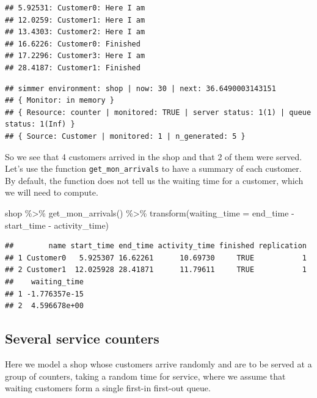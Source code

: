 \documentclass[
]{book}
\newenvironment{Shaded}{\begin{snugshade}}{\end{snugshade}}
\newcommand{\AttributeTok}[1]{\textcolor[rgb]{0.77,0.63,0.00}{#1}}
\newcommand{\FunctionTok}[1]{\textcolor[rgb]{0.00,0.00,0.00}{#1}}
\newcommand{\NormalTok}[1]{#1}
\newcommand{\SpecialCharTok}[1]{\textcolor[rgb]{0.00,0.00,0.00}{#1}}
\begin{document}
\begin{verbatim}
## 5.92531: Customer0: Here I am
## 12.0259: Customer1: Here I am
## 13.4303: Customer2: Here I am
## 16.6226: Customer0: Finished
## 17.2296: Customer3: Here I am
## 28.4187: Customer1: Finished
\end{verbatim}

\begin{verbatim}
## simmer environment: shop | now: 30 | next: 36.6490003143151
## { Monitor: in memory }
## { Resource: counter | monitored: TRUE | server status: 1(1) | queue status: 1(Inf) }
## { Source: Customer | monitored: 1 | n_generated: 5 }
\end{verbatim}

So we see that 4 customers arrived in the shop and that 2 of them were served. Let's use the function \texttt{get\_mon\_arrivals} to have a summary of each customer. By default, the function does not tell us the waiting time for a customer, which we will need to compute.

\begin{Shaded}
\begin{Highlighting}[]
\NormalTok{shop }\SpecialCharTok{\%\textgreater{}\%}
  \FunctionTok{get\_mon\_arrivals}\NormalTok{() }\SpecialCharTok{\%\textgreater{}\%}
  \FunctionTok{transform}\NormalTok{(}\AttributeTok{waiting\_time =}\NormalTok{ end\_time }\SpecialCharTok{{-}}\NormalTok{ start\_time }\SpecialCharTok{{-}}\NormalTok{ activity\_time)}
\end{Highlighting}
\end{Shaded}

\begin{verbatim}
##        name start_time end_time activity_time finished replication
## 1 Customer0   5.925307 16.62261      10.69730     TRUE           1
## 2 Customer1  12.025928 28.41871      11.79611     TRUE           1
##    waiting_time
## 1 -1.776357e-15
## 2  4.596678e+00
\end{verbatim}

\hypertarget{several-service-counters}{%
\subsection{Several service counters}\label{several-service-counters}}

Here we model a shop whose customers arrive randomly and are to be served at a group of counters, taking a random time for service, where we assume that waiting customers form a single first-in first-out queue.
\end{document}
